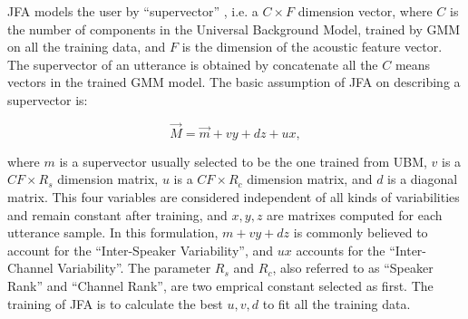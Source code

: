 JFA models the user by ``supervector'' , i.e. a $C\times F $ dimension vector, where $C$ is
the number of components in the Universal Background Model, trained by GMM on all the training data,
and $ F$ is the dimension of the acoustic feature vector. The supervector of an utterance is obtained by concatenate
all the $C $ means vectors in the trained GMM model. The basic assumption of JFA on describing a supervector is:

\[ \vec{M} = \vec{ m } + vy + dz + ux, \]

where $m$ is a supervector usually selected to be the one trained from UBM, $v$ is a $ CF \times R_s$ dimension matrix,
$ u$ is a $ CF \times R_c$ dimension matrix, and $d$ is a diagonal matrix.
This four variables are considered independent of all kinds of variabilities and remain constant after training, and
$x, y, z $ are matrixes computed for each utterance sample.
In this formulation, $ m + vy + dz$ is commonly believed to account for the ``Inter-Speaker Variability'', and $ux $ accounts
for the ``Inter-Channel Variability''.
The parameter $ R_s $ and $ R_c$, also referred to as ``Speaker Rank'' and ``Channel Rank'', are two emprical constant selected as first.
The training of JFA is to calculate the best $ u, v, d$ to fit all the training data.

